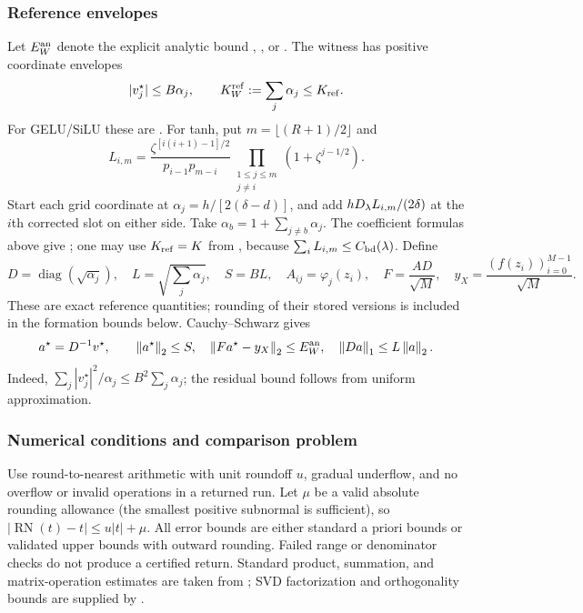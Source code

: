 \subsubsection{Reference envelopes}
Let $E_W^{\rm an}$ denote the explicit analytic bound
, , or .
The witness has positive coordinate envelopes
\begin{equation}
 |v_j^\star|\le B\alpha_j,\qquad
 K_W^{\rm ref}:=\sum_j\alpha_j\le K_{\rm ref}.
 \label{eq:coordinate-envelope}
\end{equation}
For GELU/SiLU these are .
For tanh, put $m=\lfloor(R+1)/2\rfloor$ and
\begin{equation}
 L_{i,m}=\frac{\zeta^{[i(i+1)-1]/2}}{p_{i-1}p_{m-i}}
             \prod_{\substack{1\le j\le m\\j\ne i}}(1+\zeta^{j-1/2}).
 \label{eq:Lim}
\end{equation}
Start each grid coordinate at $\alpha_j=h/[2(\delta-d)]$, and add
$hD_\lambda L_{i,m}/(2\delta)$ at the $i$th corrected slot on either side.
Take $\alpha_b=1+\sum_{j\ne b}\alpha_j$. The coefficient formulas above give
; one may use $K_{\rm ref}=K$ from
, because $\sum_iL_{i,m}\le C_{\mathrm{bd}}(\lambda)$.
Define
\begin{equation}
 D=\operatorname{diag}(\sqrt{\alpha_j}),\quad
 L=\sqrt{\sum_j\alpha_j},\quad S=BL,\quad
 A_{ij}=\varphi_j(z_i),\quad
 F=\frac{AD}{\sqrt M},\quad y_X=\frac{(f(z_i))_{i=0}^{M-1}}{\sqrt M}.
 \label{eq:scaling}
\end{equation}
These are exact reference quantities; rounding of their stored versions is
included in the formation bounds below. Cauchy--Schwarz gives
\begin{equation}
 a^\star=D^{-1}v^\star,\qquad
 \left\lVert a^\star\right\rVert_2\le S,\quad
 \left\lVert Fa^\star-y_X\right\rVert_2\le E_W^{\rm an},\quad
 \left\lVert Da\right\rVert_1\le L\left\lVert a\right\rVert_2.
 \label{eq:scaled-witness}
\end{equation}
Indeed, $\sum_j|v_j^\star|^2/\alpha_j\le B^2\sum_j\alpha_j$;
the residual bound follows from uniform approximation.

\subsubsection{Numerical conditions and comparison problem}
Use round-to-nearest arithmetic with unit roundoff $u$, gradual underflow,
and no overflow or invalid operations in a returned run. Let $\mu$ be a
valid absolute rounding allowance (the smallest positive subnormal is
sufficient), so $|\operatorname{RN}(t)-t|\le u|t|+\mu$.
All error bounds are either standard a priori bounds or validated upper
bounds with outward rounding. Failed range or denominator checks do not
produce a certified return. Standard product, summation, and matrix-operation
estimates are taken from \cite[Chs.~2--4]{Higham2002}; SVD factorization
and orthogonality bounds are supplied by \cite[Ch.~4]{LAPACK1999}.

